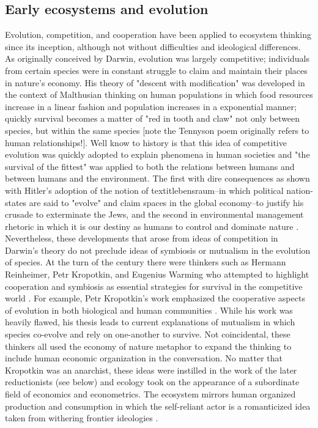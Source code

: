 \subsection{Early ecosystems and evolution}
Evolution, competition, and cooperation have been applied to ecosystem thinking since its inception, although not without difficulties and ideological differences. As originally conceived by Darwin, evolution was largely competitive; individuals from certain species were in constant struggle to claim and maintain their places in nature's economy. His theory of "descent with modification" was developed in the context of Malthusian thinking on human populations in which food resources increase in a linear fashion and population increases in a exponential manner; quickly survival becomes a matter of "red in tooth and claw" not only between species, but within the same species \cite{stoddart_1966,tennyson_1849} [note the Tennyson poem originally refers to human relationships!]. Well know to history is that this idea of competitive evolution was quickly adopted to explain phenomena in human societies and "the survival of the fittest" was applied to both the relations between humans and between humans and the environment. The first with dire consequences as shown with Hitler's adoption of the notion of textit{lebensraum}--in which political nation-states are said to "evolve" and claim spaces in the global economy--to justify his crusade to exterminate the Jews, and the second in environmental management rhetoric in which it is our destiny as humans to control and dominate nature \cite{stoddart_1966,worster_1977}. Nevertheless, these developments that arose from ideas of competition in Darwin's theory do not preclude ideas of symbiosis or mutualism in the evolution of species. At the turn of the century there were thinkers such as Hermann Reinheimer, Petr Kropotkin, and Eugenius Warming who attempted to highlight cooperation and symbiosis as essential strategies for survival in the competitive world \cite{worster_1977}. For example, Petr Kropotkin's work emphasized the cooperative aspects of evolution in both biological and human communities \cite{kropotkin_1902}. While his work was heavily flawed, his thesis leads to current explanations of mutualism in which species co-evolve and rely on one-another to survive. Not coincidental, these thinkers all used the economy of nature metaphor to expand the thinking to include human economic organization in the conversation. No matter that Kropotkin was an anarchist, these ideas were instilled in the work of the later reductionists (see below) and ecology took on the appearance of a subordinate field of economics and econometrics. The ecosystem mirrors human organized production and consumption in which the self-reliant actor is a romanticized idea taken from withering frontier ideologies \cite{worster_1977}.

